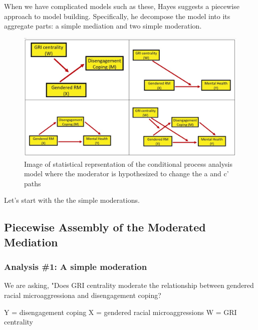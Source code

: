 \documentclass[
  english,
]{book}
\begin{document}
When we have complicated models such as these, Hayes \citeyearpar{hayes_introduction_2018} suggests a piecewise approach to model building. Specifically, he decompose the model into its aggregate parts: a simple mediation and two simple moderation.

\begin{figure}
\centering
\includegraphics{images/ModMed/PiecewiseAssembly.jpg}
\caption{Image of statistical reprsentation of the conditional process analysis model where the moderator is hypothesized to change the a and c' paths}
\end{figure}

Let's start with the the simple moderations.

\hypertarget{piecewise-assembly-of-the-moderated-mediation}{%
\subsection{Piecewise Assembly of the Moderated Mediation}\label{piecewise-assembly-of-the-moderated-mediation}}

\hypertarget{analysis-1-a-simple-moderation}{%
\subsubsection{Analysis \#1: A simple moderation}\label{analysis-1-a-simple-moderation}}

We are asking, "Does GRI centrality moderate the relationship between gendered racial microaggressiona and disengagement coping?

Y = disengagement coping
X = gendered racial microaggressions
W = GRI centrality
\end{document}
